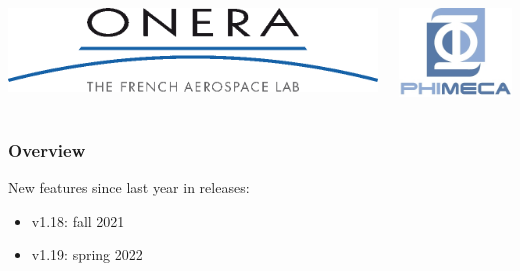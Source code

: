 \documentclass[aspectratio=169]{beamer}
\begin{document}
\begin{frame}
\begin{columns}
  \begin{center}
\includegraphics[height=0.05\textheight]{figures/onera-logo.png}
\end{center}

  \begin{center}
\includegraphics[height=0.08\textheight]{figures/logo-phimeca.png}
\end{center}


  \end{columns}

  \end{frame}

\begin{frame}
\frametitle{Overview}

New features since last year in releases:

\begin{itemize}
\item v1.18: fall 2021
\item v1.19: spring 2022
\end{itemize}



\end{frame}
  
\end{document}
